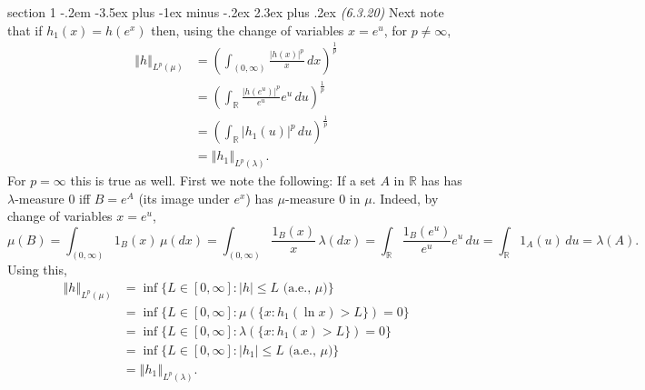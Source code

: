 \documentclass[12pt]{article}
\makeatletter
\theoremstyle{norm}
\newcommand{\R}[0]{\mathbb{R}}
\newcommand{\rc}[1]{\frac{1}{#1}}
\newcommand{\la}[0]{\lambda}
\newcommand{\pa}[1]{\left( {#1} \right)}
\newcommand{\ve}[1]{\left\Vert {#1}\right\Vert}
\newcommand{\iy}[0]{\infty}
\newcommand{\iiy}[0]{\int_{(0,\iy)}}
\newcommand{\ir}[0]{\int_{\R}}
\newenvironment{problem}{\@startsection
       {section}
       {1}
       {-.2em}
       {-3.5ex plus -1ex minus -.2ex}
       {2.3ex plus .2ex}
       {\pagebreak[3]%
       \large\bf\noindent{Problem }
       }
       }
       {%
       }
\makeatother
\begin{document}
\begin{problem} {\it (6.3.20)}
Next note that if $h_1(x)=h(e^x)$ then, using the change of variables $x=e^u$, for $p\ne \iy$,
\begin{align}
\nonumber
\ve{h}_{L^p(\mu)}
&=\pa{\int_{(0,\iy)}\frac{|h(x)|^p}{x}\,dx}^{\rc p}\\
\nonumber
&=\pa{\ir\frac{|h(e^u)|^p}{e^u}e^u\,du}^{\rc p}\\
\nonumber
&=\pa{\ir|h_1(u)|^p\,du}^{\rc p}\\
\label{p6-4-3}
&=\ve{h_1}_{L^p(\la)}.
\end{align}
For $p=\iy$ this is true as well. First we note the following:
If a set $A$ in $\R$ has has $\la$-measure 0 iff $B=e^A$ (its image under $e^x$) has $\mu$-measure 0 in $\mu$. Indeed, by change of variables $x=e^u$,
\begin{equation}\label{p6-4-4}
\mu(B)=\iiy 1_B(x)\,\mu(dx)=\iiy \frac{1_B(x)}{x}\,\la(dx)=\ir \frac{1_B(e^u)}{e^u}e^u\,du=\ir 1_A(u)\,du=\la(A).
\end{equation}
Using this,
\begin{align*}
\ve{h}_{L^p(\mu)}&=\inf\{L\in [0,\iy]: |h|\le L\text{ (a.e., }\mu)\}\\
&=
\inf \{L\in [0,\iy]:\mu(\{x:h_1(\ln x)> L\})=0\}\\
&=
\inf \{L\in [0,\iy]:\la(\{x:h_1(x)> L\})=0\}\\
&=\inf\{L\in [0,\iy]:|h_1|\le L\text{ (a.e., }\mu)\}\\
&=\ve{h_1}_{L^p(\la)}.\end{align*}


\end{problem}
\end{document}
